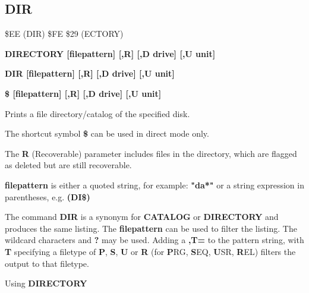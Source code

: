 
\newpage
\subsection{DIR}
\begin{description}[leftmargin=2cm,style=nextline]
\item [Token:] \$EE (DIR) \$FE \$29 (ECTORY)
\item [Format:] {\bf DIRECTORY [filepattern] [,R] [,D drive] [,U unit] }
\item [Format:] {\bf DIR [filepattern] [,R] [,D drive] [,U unit] }
\item [Format:] {\bf \$ [filepattern] [,R] [,D drive] [,U unit] }
\item [Usage:]  Prints a file directory/catalog of the specified disk.

   The shortcut symbol {\bf \$} can be used in direct mode only.

   The {\bf R} (Recoverable) parameter includes files in the
   directory, which are flagged as deleted but are still
   recoverable.

   {\bf filepattern} is either a quoted string, for example: {\bf "da*"} or
   a string expression in parentheses, e.g. {\bf (DI\$)}

   \drivedefinition

   \unitdefinition

\item [Remarks:]
   The command {\bf DIR} is a synonym for {\bf CATALOG}
   or {\bf DIRECTORY} and produces the same listing.
   The {\bf filepattern} can be used to filter the listing.
   The wildcard characters {\bf *} and {\bf ?} may be used.
   Adding a {\bf ,T=} to the pattern string, with {\bf T} specifying
   a filetype of {\bf P}, {\bf S}, {\bf U} or {\bf R}
   (for {\bf P}RG, {\bf S}EQ, {\bf U}SR, {\bf R}EL) filters the
   output to that filetype.

\item [Example:] Using {\bf DIRECTORY}


%
%
%
%
%


\end{description}
